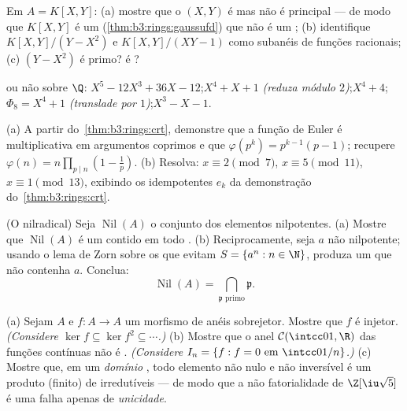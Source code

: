 \begin{exercise}[$\star\star$]\label{exo:b3:rings:6}
Em $A = K[X, Y]$: (a) mostre que o  $(X, Y)$ é  mas não é
principal --- de modo que $K[X,Y]$ é um  (\cref{thm:b3:rings:gaussufd}) que
não é um ; (b) identifique $K[X, Y]/(Y - X^2)$ e $K[X,Y]/(XY - 1)$ como subanéis de funções
racionais; (c) $(Y - X^2)$ é primo? é ?
\end{exercise}

\begin{exercise}[$\star\star$]\label{exo:b3:rings:7}
 ou não sobre $\Q$: $X^5 - 12X^3 + 36X - 12$;\quad $X^4 + X + 1$ \emph{(reduza
módulo $2$)};\quad $X^4 + 4$;\quad $\Phi_8 = X^4 + 1$ \emph{(translade por
$1$)};\quad $X^3 - X - 1$.
\end{exercise}

\begin{exercise}[$\star\star$]\label{exo:b3:rings:8}
(a) A partir do~\cref{thm:b3:rings:crt}, demonstre que a função de Euler é
multiplicativa em argumentos coprimos e que $\varphi(p^k) =
p^{k-1}(p-1)$; recupere $\varphi(n) = n\prod_{p \mid n}(1 -
\frac1p)$.
(b) Resolva: $x \equiv 2 \pmod 7$, $x \equiv 5 \pmod{11}$, $x
\equiv 1 \pmod{13}$, exibindo os idempotentes $e_k$ da
demonstração do~\cref{thm:b3:rings:crt}.
\end{exercise}

\begin{exercise}[$\star\star\star$]\label{exo:b3:rings:9}
(O nilradical) Seja $\operatorname{Nil}(A)$ o conjunto dos elementos nilpotentes. (a)
Mostre que $\operatorname{Nil}(A)$ é um  contido em todo . (b)
Reciprocamente, seja $a$ não nilpotente; usando o lema de Zorn
sobre os  que evitam $S =
\{a^n : n \in \N\}$, produza um  que não
contenha $a$. Conclua:
\[
\operatorname{Nil}(A) = \bigcap_{\mathfrak p \text{ primo}}
\mathfrak p .
\]
\end{exercise}

\begin{exercise}[$\star\star\star$]\label{exo:b3:rings:10}
(a) Sejam $A$  e $f \colon A \to A$ um morfismo de anéis sobrejetor.
Mostre que $f$ é injetor. \emph{(Considere $\ker
f \subseteq \ker f^2 \subseteq \cdots$.)}
(b) Mostre que o anel $\mathcal C(\intcc01, \R)$ das funções contínuas não é .
\emph{(Considere $I_n = \{f : f = 0
\text{ em } \intcc0{1/n}\}$.)}
(c) Mostre que, em um \emph{domínio} , todo elemento não
nulo e não inversível é um produto (finito) de irredutíveis --- de modo
que a não fatorialidade de $\Z[\iu\sqrt 5]$ é uma falha apenas de
\emph{unicidade}.
\end{exercise}


